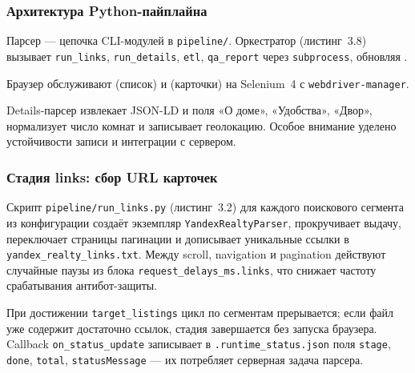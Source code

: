 \subsubsection{Архитектура Python-пайплайна}

Парсер --- цепочка CLI-модулей в \texttt{pipeline/}. Оркестратор  (листинг~3.8) вызывает \texttt{run\_links}, \texttt{run\_details}, \texttt{etl}, \texttt{qa\_report} через \texttt{subprocess}, обновляя .

Браузер обслуживают  (список) и  (карточки) на Selenium~4 с \texttt{webdriver-manager}.

Details-парсер извлекает JSON-LD и поля «О доме», «Удобства», «Двор», нормализует число комнат и записывает геолокацию. Особое внимание уделено устойчивости записи и интеграции с сервером.

\subsubsection{Стадия links: сбор URL карточек}

Скрипт \texttt{pipeline/run\_links.py} (листинг~3.2) для каждого поискового сегмента из конфигурации создаёт экземпляр \texttt{YandexRealtyParser}, прокручивает выдачу, переключает страницы пагинации и дописывает уникальные ссылки в \texttt{yandex\_realty\_links.txt}. Между scroll, navigation и pagination действуют случайные паузы из блока \texttt{request\_delays\_ms.links}, что снижает частоту срабатывания антибот-защиты.

При достижении \texttt{target\_listings} цикл по сегментам прерывается; если файл уже содержит достаточно ссылок, стадия завершается без запуска браузера. Callback \texttt{on\_status\_update} записывает в \texttt{.runtime\_status.json} поля \texttt{stage}, \texttt{done}, \texttt{total}, \texttt{statusMessage} --- их потребляет серверная задача парсера.

